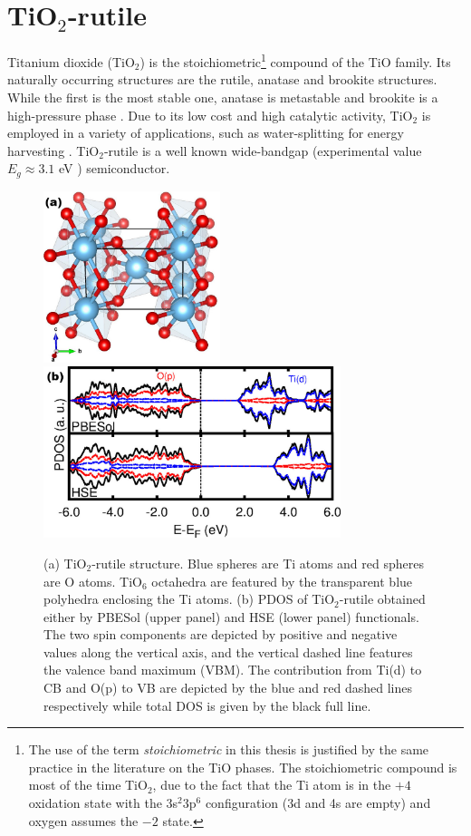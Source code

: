 \section{TiO$_2$-rutile}
\label{sec:tio2}

Titanium dioxide (TiO$_2$) is the stoichiometric\footnote{The use of the term \textit{stoichiometric} in this thesis is justified by the same practice in the literature on the TiO phases. The stoichiometric compound is most of the time TiO$_2$, due to the fact that the Ti atom is in the $+4$ oxidation state with the 3s$^2$3p$^6$ configuration (3d and 4s are empty) and oxygen assumes the $-2$ state.} compound of the TiO family. Its naturally occurring structures are the rutile, anatase and brookite structures. While the first is the most stable one, anatase is metastable and brookite is a high-pressure phase \cite{Dachille1968}. Due to its low cost and high catalytic activity, TiO$_2$ is employed in a variety of applications, such as water-splitting for energy harvesting \cite{Scanlon2013}. TiO$_2$-rutile is a well known wide-bandgap (experimental value $E_g \approx 3.1$ eV \cite{Amtout1995}) semiconductor. 

\begin{figure}[!ht]
 \centering
  \includegraphics[height=5cm]{img/tio2-rutile.jpg}
  \qquad
  \includegraphics[height=5cm]{img/dos-tio2-rutile.jpg}
  \caption{(a) TiO$_2$-rutile structure. Blue spheres are Ti atoms and red spheres are O atoms. TiO$_6$ octahedra are featured by the transparent blue polyhedra enclosing the Ti atoms. (b) PDOS of TiO$_2$-rutile obtained either by PBESol (upper panel) and HSE (lower panel) functionals. The two spin components are depicted by positive and negative values along the vertical axis, and the vertical dashed line features the valence band maximum (VBM). The contribution from Ti(d) to CB and O(p) to VB are depicted by the blue and red dashed lines respectively while total DOS is given by the black full line.} 
  \label{fig:tio2}
\end{figure}

